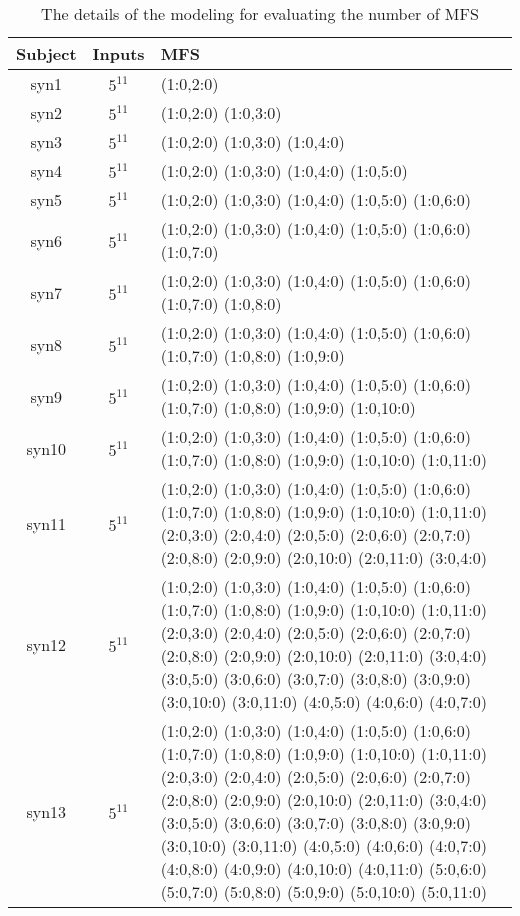 \documentclass[10pt,journal,compsoc]{IEEEtran}
\begin{document}
\begin{table*}[htbp]
\center
\caption{The details of the modeling for evaluating the number of MFS}
\label{detail-eva-mfs}

\begin{tabular}{|c|c|m{}|}
\hline
Subject & Inputs & MFS  \\\hline
syn1 & $5^{11}$ & (1:0,2:0)  \\ \hline
syn2 & $5^{11}$ & (1:0,2:0) (1:0,3:0)  \\ \hline
syn3 & $5^{11}$ & (1:0,2:0) (1:0,3:0) (1:0,4:0)  \\ \hline
syn4 & $5^{11}$ & (1:0,2:0) (1:0,3:0) (1:0,4:0) (1:0,5:0)  \\ \hline
syn5 & $5^{11}$ & (1:0,2:0) (1:0,3:0) (1:0,4:0) (1:0,5:0) (1:0,6:0)  \\ \hline
syn6 & $5^{11}$ & (1:0,2:0) (1:0,3:0) (1:0,4:0) (1:0,5:0) (1:0,6:0) (1:0,7:0)  \\ \hline
syn7 & $5^{11}$ & (1:0,2:0) (1:0,3:0) (1:0,4:0) (1:0,5:0) (1:0,6:0) (1:0,7:0) (1:0,8:0)  \\ \hline
syn8 & $5^{11}$ & (1:0,2:0) (1:0,3:0) (1:0,4:0) (1:0,5:0) (1:0,6:0) (1:0,7:0) (1:0,8:0) (1:0,9:0)  \\ \hline
syn9 & $5^{11}$ & (1:0,2:0) (1:0,3:0) (1:0,4:0) (1:0,5:0) (1:0,6:0) (1:0,7:0) (1:0,8:0) (1:0,9:0) (1:0,10:0)  \\ \hline
syn10 & $5^{11}$ & (1:0,2:0) (1:0,3:0) (1:0,4:0) (1:0,5:0) (1:0,6:0) (1:0,7:0) (1:0,8:0) (1:0,9:0) (1:0,10:0) (1:0,11:0)  \\ \hline
syn11 & $5^{11}$ & (1:0,2:0) (1:0,3:0) (1:0,4:0) (1:0,5:0) (1:0,6:0) (1:0,7:0) (1:0,8:0) (1:0,9:0) (1:0,10:0) (1:0,11:0) (2:0,3:0) (2:0,4:0) (2:0,5:0) (2:0,6:0) (2:0,7:0) (2:0,8:0) (2:0,9:0) (2:0,10:0) (2:0,11:0) (3:0,4:0)  \\ \hline
syn12 & $5^{11}$ & (1:0,2:0) (1:0,3:0) (1:0,4:0) (1:0,5:0) (1:0,6:0) (1:0,7:0) (1:0,8:0) (1:0,9:0) (1:0,10:0) (1:0,11:0) (2:0,3:0) (2:0,4:0) (2:0,5:0) (2:0,6:0) (2:0,7:0) (2:0,8:0) (2:0,9:0) (2:0,10:0) (2:0,11:0) (3:0,4:0) (3:0,5:0) (3:0,6:0) (3:0,7:0) (3:0,8:0) (3:0,9:0) (3:0,10:0) (3:0,11:0) (4:0,5:0) (4:0,6:0) (4:0,7:0)  \\ \hline
syn13 & $5^{11}$ & (1:0,2:0) (1:0,3:0) (1:0,4:0) (1:0,5:0) (1:0,6:0) (1:0,7:0) (1:0,8:0) (1:0,9:0) (1:0,10:0) (1:0,11:0) (2:0,3:0) (2:0,4:0) (2:0,5:0) (2:0,6:0) (2:0,7:0) (2:0,8:0) (2:0,9:0) (2:0,10:0) (2:0,11:0) (3:0,4:0) (3:0,5:0) (3:0,6:0) (3:0,7:0) (3:0,8:0) (3:0,9:0) (3:0,10:0) (3:0,11:0) (4:0,5:0) (4:0,6:0) (4:0,7:0) (4:0,8:0) (4:0,9:0) (4:0,10:0) (4:0,11:0) (5:0,6:0) (5:0,7:0) (5:0,8:0) (5:0,9:0) (5:0,10:0) (5:0,11:0)  \\ \hline

\end{tabular}
\end{table*}
\end{document}
